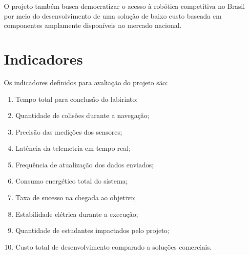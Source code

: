 O projeto também busca democratizar o acesso à robótica competitiva no Brasil por meio do desenvolvimento de uma solução de baixo custo baseada em componentes amplamente disponíveis no mercado nacional.

\section{Indicadores}

Os indicadores definidos para avaliação do projeto são:

\begin{enumerate}
    \item Tempo total para conclusão do labirinto;
    
    \item Quantidade de colisões durante a navegação;
    
    \item Precisão das medições dos sensores;
    
    \item Latência da telemetria em tempo real;
    
    \item Frequência de atualização dos dados enviados;
    
    \item Consumo energético total do sistema;
    
    \item Taxa de sucesso na chegada ao objetivo;
    
    \item Estabilidade elétrica durante a execução;
    
    \item Quantidade de estudantes impactados pelo projeto;
    
    \item Custo total de desenvolvimento comparado a soluções comerciais.
\end{enumerate}